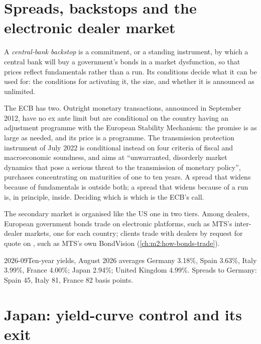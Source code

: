 \section{Spreads, backstops and the electronic dealer market}

\begin{definition}\label{def:m2:european-and-japanese-government-bonds:backstop}
A \emph{central-bank backstop} is a commitment, or
a standing instrument, by which a central bank will buy a government's bonds
in a market dysfunction, so that prices reflect fundamentals rather than a
run. Its conditions decide what it can be used for: the conditions for
activating it, the size, and whether it is announced as unlimited.
\end{definition}

The ECB has two. Outright monetary transactions, announced in September 2012,
have no ex ante limit but are conditional on the country having an adjustment
programme with the European Stability Mechanism: the promise is as large as
needed, and its price is a programme. The transmission protection
instrument of July 2022 is conditional instead on four criteria of fiscal
and macroeconomic soundness, and aims at ``unwarranted, disorderly market
dynamics that pose a serious threat to the transmission of monetary policy'',
purchases concentrating on maturities of one to ten years. A spread that
widens because of fundamentals is outside both; a spread that widens because
of a run is, in principle, inside. Deciding which is which is the ECB's call.

The secondary market is organised like the US one in two tiers. Among dealers,
European government bonds trade on electronic platforms, such as MTS's
inter-dealer markets, one for each country; clients trade with dealers by
request for quote on , such as MTS's own BondVision
(\cref{ch:m2:how-bonds-trade}).

\begin{dated}{2026-09}{Ten-year yields, August 2026 averages}\label{dat:m2:european-and-japanese-government-bonds:yields}
Germany 3.18\%, Spain 3.63\%, Italy 3.99\%, France 4.00\%; Japan 2.94\%; United
Kingdom 4.99\%. Spreads to Germany: Spain 45, Italy 81, France 82 basis points.
\end{dated}

\section{Japan: yield-curve control and its exit}


